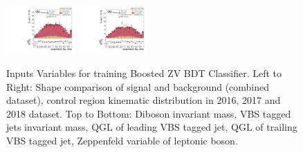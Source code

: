 \begin{figure}[!ht]
  \includegraphics[width=0.235\textwidth]{analysis_plots/2017_zv/cr_vjets_l/zeppenfeld_lep_deta.pdf} \hspace{-12pt}
  \includegraphics[width=0.235\textwidth]{analysis_plots/2018_zv/cr_vjets_l/zeppenfeld_lep_deta.pdf} \hspace{-12pt} \\ \vspace{-1pt}
  \caption[Inputs Variables for training Boosted ZV BDT Classifier]%
  {Inputs Variables for training Boosted ZV BDT Classifier.
    Left to Right: Shape comparison of signal and background (combined dataset), control region
    kinematic distribution in 2016, 2017 and 2018 dataset.
    Top to Bottom: Diboson invariant mass, VBS tagged jets invariant mass, QGL of leading
    VBS tagged jet, QGL of trailing VBS tagged jet, Zeppenfeld variable of leptonic boson.}%
  \label{fig:vbs-training-input-zv}
\end{figure}

